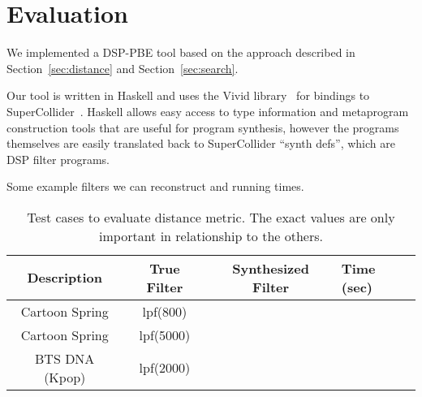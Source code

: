 \section{Evaluation}

We implemented a DSP-PBE tool based on the approach described in Section~\ref{sec:distance} and Section~\ref{sec:search}.

Our tool is written in Haskell and uses the Vivid library~\cite{vivid} for bindings to SuperCollider~\cite{supercollider}.
Haskell allows easy access to type information and metaprogram construction tools that are useful for program synthesis, however the programs themselves are easily translated back to SuperCollider ``synth defs'', which are DSP filter programs.

Some example filters we can reconstruct and running times.


\begin{table*}[!h]
\centering
\begin{tabular}{|c | c | c|} 
 \hline
 Description & True Filter & Synthesized Filter & Time (sec) \\ 
 \hline\hline
 Cartoon Spring & lpf(800)  & & \\
 Cartoon Spring & lpf(5000) & & \\
 BTS DNA (Kpop) & lpf(2000) & & \\
 \hline
\end{tabular}
\caption{Test cases to evaluate distance metric. The exact values are only important in relationship to the others.}
\label{table:dist}
\end{table*}


